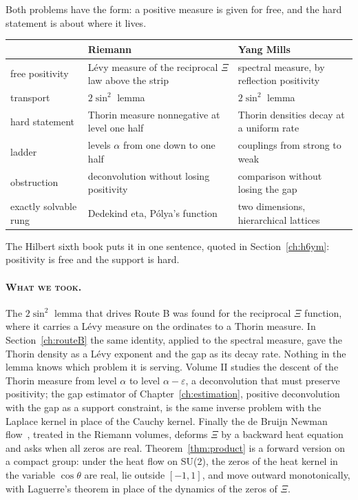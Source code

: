Both problems have the form: a positive measure is given for free, and the hard statement is about where it lives.
\begin{center}
\small
\begin{tabular}{p{1.05in}p{1.5in}p{1.5in}}
\toprule
 & Riemann & Yang Mills \\ \midrule
free positivity & L\'evy measure of the reciprocal $\Xi$ law above the strip & spectral measure, by reflection positivity \\
transport & $2\sin^2$ lemma & $2\sin^2$ lemma \\
hard statement & Thorin measure nonnegative at level one half & Thorin densities decay at a uniform rate \\
ladder & levels $\alpha$ from one down to one half & couplings from strong to weak \\
obstruction & deconvolution without losing positivity & comparison without losing the gap \\
exactly solvable rung & Dedekind eta, P\'olya's function & two dimensions, hierarchical lattices \\
\bottomrule
\end{tabular}
\end{center}
The Hilbert sixth book puts it in one sentence, quoted in Section~\ref{ch:h6ym}: positivity is free and the support is hard.

\paragraph{\normalfont\scshape What we took.} The $2\sin^2$ lemma that drives Route B was found for the reciprocal $\Xi$ function, where it carries a L\'evy measure on the ordinates to a Thorin measure. In Section~\ref{ch:routeB} the same identity, applied to the spectral measure, gave the Thorin density as a L\'evy exponent and the gap as its decay rate. Nothing in the lemma knows which problem it is serving. Volume II studies the descent of the Thorin measure from level $\alpha$ to level $\alpha-\varepsilon$, a deconvolution that must preserve positivity; the gap estimator of Chapter~\ref{ch:estimation}, positive deconvolution with the gap as a support constraint, is the same inverse problem with the Laplace kernel in place of the Cauchy kernel. Finally the de Bruijn Newman flow~\cite{dB50}, treated in the Riemann volumes, deforms $\Xi$ by a backward heat equation and asks when all zeros are real. Theorem~\ref{thm:product} is a forward version on a compact group: under the heat flow on SU(2), the zeros of the heat kernel in the variable $\cos\theta$ are real, lie outside $[-1,1]$, and move outward monotonically, with Laguerre's theorem in place of the dynamics of the zeros of $\Xi$.

